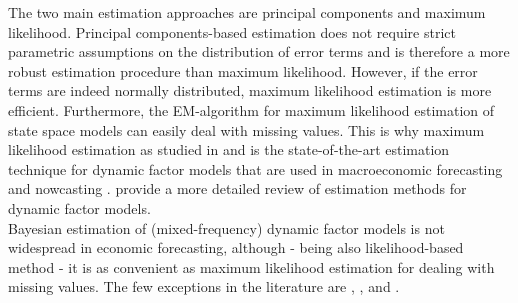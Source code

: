 The two main estimation approaches are principal components and maximum likelihood. Principal components-based estimation does not require strict parametric assumptions on the distribution of error terms and is therefore a more robust estimation procedure than maximum likelihood. However, if the error terms are indeed normally distributed, maximum likelihood estimation is more efficient. Furthermore, the EM-algorithm for maximum likelihood estimation of state space models can easily deal with missing values. This is why maximum likelihood estimation as studied in \citet{DozEtal2012} and \citet{BanburaModugno2014} is the state-of-the-art estimation technique for dynamic factor models that are used in macroeconomic forecasting and nowcasting \citep[for example, see][for a description of model of the Federal Reserve Bank of New York for nowcasting real GDP growth]{BokEtal2017}. \citet{StockWatson2011} provide a more detailed review of estimation methods for dynamic factor models.\\


Bayesian estimation of (mixed-frequency) dynamic factor models is not widespread in economic forecasting, although - being also likelihood-based method - it is as convenient as maximum likelihood estimation for dealing with missing values. The few exceptions in the literature are \citet{LucianiRicci2014}, \citet{DAgostinoEtal2016}, \citet{MarcellinoEtal2016} and \citet{AntolinDiazEtal2017}.



